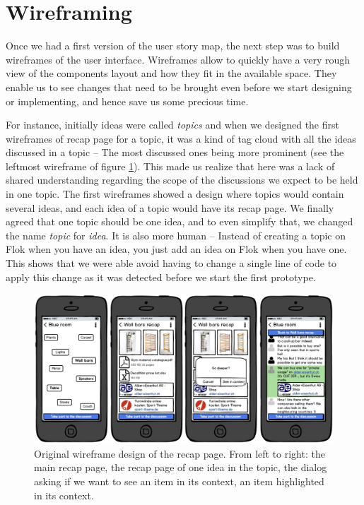 \documentclass[a4paper,12pt,twoside]{article}
\begin{document}
\clearpage

\section{Wireframing}
Once we had a first version of the user story map, the next step was to build wireframes of the user interface.
Wireframes allow to quickly have a very rough view of the components layout and how they fit in the available space.
They enable us to see changes that need to be brought even before we start designing or implementing, and hence save us some precious time.

For instance, initially ideas were called \emph{topics} and when we designed the first wireframes of recap page for a topic, it was a kind of tag cloud with all the ideas discussed in a topic – The most discussed ones being more prominent (see the leftmost wireframe of figure \ref{fig.originalRecapWireframes}).
This made us realize that here was a lack of shared understanding regarding the scope of the discussions we expect to be held in one topic.
The first wireframes showed a design where topics would contain several ideas, and each idea of a topic would have its recap page.
We finally agreed that one topic should be one idea, and to even simplify that, we changed the name \emph{topic} for \emph{idea}.
It is also more human – Instead of creating a topic on Flok when you have an idea, you just add an idea on Flok when you have one.
This shows that we were able avoid having to change a single line of code to apply this change as it was detected before we start the first prototype.

\begin{figure}[!htb]
    \centering
    \includegraphics[width=\textwidth]{images/originalRecapWireframes.png}
    \caption{Original wireframe design of the recap page. From left to right: the main recap page, the recap page of one idea in the topic, the dialog asking if we want to see an item in its context, an item highlighted in its context.}
    \label{fig.originalRecapWireframes}
\end{figure}
\end{document}
